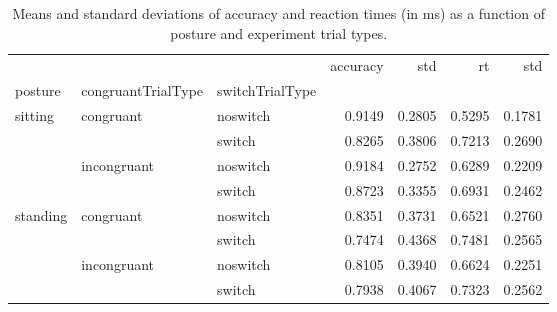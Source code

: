 \begin{table}
\centering
\caption{Means and standard deviations of accuracy and reaction times (in ms) as a function of posture and experiment trial types.}
\label{table-task-switching-replication-reaction-time}
\begin{tabular}{lllrrrr}
\toprule
         &             &        & accuracy &    std &     rt &    std \\
posture & congruantTrialType & switchTrialType &          &        &        &        \\
\midrule
sitting & congruant & noswitch &   0.9149 & 0.2805 & 0.5295 & 0.1781 \\
         &             & switch &   0.8265 & 0.3806 & 0.7213 & 0.2690 \\
         & incongruant & noswitch &   0.9184 & 0.2752 & 0.6289 & 0.2209 \\
         &             & switch &   0.8723 & 0.3355 & 0.6931 & 0.2462 \\
standing & congruant & noswitch &   0.8351 & 0.3731 & 0.6521 & 0.2760 \\
         &             & switch &   0.7474 & 0.4368 & 0.7481 & 0.2565 \\
         & incongruant & noswitch &   0.8105 & 0.3940 & 0.6624 & 0.2251 \\
         &             & switch &   0.7938 & 0.4067 & 0.7323 & 0.2562 \\
\bottomrule
\end{tabular}
\end{table}
